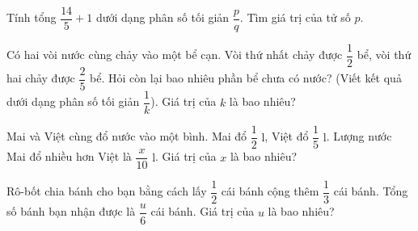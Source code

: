 \begin{ex} %
Tính tổng $\dfrac{14}{5} + 1$ dưới dạng phân số tối giản $\dfrac{p}{q}$. Tìm giá trị của tử số $p$.
\end{ex}

\begin{ex} %
Có hai vòi nước cùng chảy vào một bể cạn. Vòi thứ nhất chảy được $\dfrac{1}{2}$ bể, vòi thứ hai chảy được $\dfrac{2}{5}$ bể. Hỏi còn lại bao nhiêu phần bể chưa có nước? (Viết kết quả dưới dạng phân số tối giản $\dfrac{1}{k}$). Giá trị của $k$ là bao nhiêu?
\end{ex}

\begin{ex} %
Mai và Việt cùng đổ nước vào một bình. Mai đổ $\dfrac{1}{2}\text{ l}$, Việt đổ $\dfrac{1}{5}\text{ l}$. Lượng nước Mai đổ nhiều hơn Việt là $\dfrac{x}{10}\text{ l}$. Giá trị của $x$ là bao nhiêu?
\end{ex}

\begin{ex} %
Rô-bốt chia bánh cho bạn bằng cách lấy $\dfrac{1}{2}$ cái bánh cộng thêm $\dfrac{1}{3}$ cái bánh. Tổng số bánh bạn nhận được là $\dfrac{u}{6}$ cái bánh. Giá trị của $u$ là bao nhiêu?
\end{ex}
